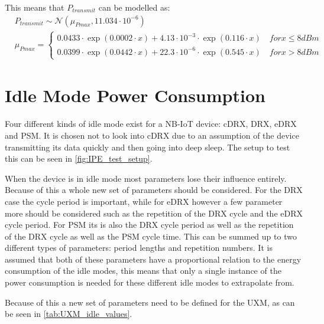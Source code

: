 This means that $P_{transmit}$ can be modelled as:
\begin{align}
&P_{transmit} \sim \mathcal{N}(\mu_{Pmax},11.034\cdot 10^{-6}) \\ \nonumber
&\mu_{Pmax} = \begin{cases} 0.0433\cdot\exp{(0.0002\cdot x)} + 4.13\cdot10^{-3}\cdot\exp{(0.116\cdot x)} \quad for x \leq 8 dBm \\
0.0399\cdot\exp{(0.0442\cdot x)} + 22.3\cdot10^{-6}\cdot\exp{(0.545\cdot x)} \quad for x > 8 dBm \end{cases}
\end{align}


\section{Idle Mode Power Consumption}
Four different kinds of idle mode exist for a NB-IoT device: \gls{cDRX}, \gls{DRX}, \gls{eDRX} and \gls{PSM}. It is chosen not to look into \gls{cDRX} due to an assumption of the device transmitting its data quickly and then going into deep sleep. The setup to test this can be seen in \autoref{fig:IPE_test_setup}.

When the device is in idle mode most parameters lose their influence entirely. Because of this a whole new set of parameters should be considered. For the \gls{DRX} case the cycle period is important, while for \gls{eDRX} however a few parameter more should be considered such as the repetition of the DRX cycle and the eDRX cycle period. For \gls{PSM} its is also the DRX cycle period as well as the repetition of the DRX cycle as well as the PSM cycle time. This can be summed up to two different types of parameters: period lengths and repetition numbers. It is assumed that both of these parameters have a proportional relation to the energy consumption of the idle modes, this means that only a single instance of the power consumption is needed for these different idle modes to extrapolate from.

Because of this a new set of parameters need to be defined for the UXM, as can be seen in \autoref{tab:UXM_idle_values}.

